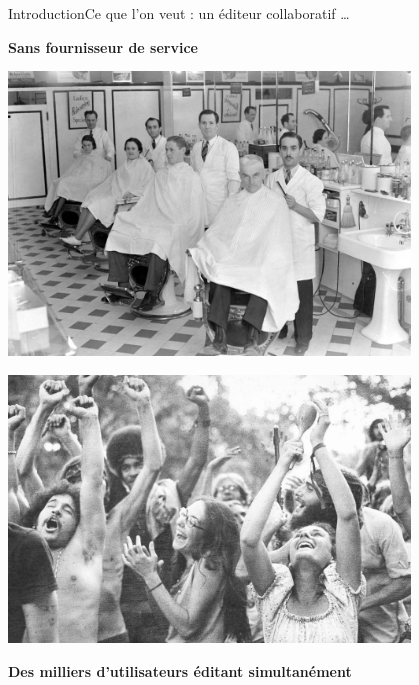 \begin{frame}{Introduction}{Ce que l'on veut : un éditeur collaboratif \ldots}
  \vspace{-0.75cm}
  
  \begin{minipage}{0.45\textwidth}
    \hfill \NO{\xmark}\textbf{Sans fournisseur de service}
  \end{minipage}
  \begin{minipage}{0.45\textwidth}
    \includegraphics[width=0.8\textwidth]{img/service.jpg}
  \end{minipage}

  \vspace{-0.75cm}

  \begin{minipage}{0.45\textwidth}
    \hfill \includegraphics[width=0.8\textwidth]{img/crowd.jpg}
  \end{minipage}
  \begin{minipage}{0.45\textwidth}
    \textbf{Des milliers d'utilisateurs éditant simultanément} \NO{\xmark}
  \end{minipage}

\end{frame}


